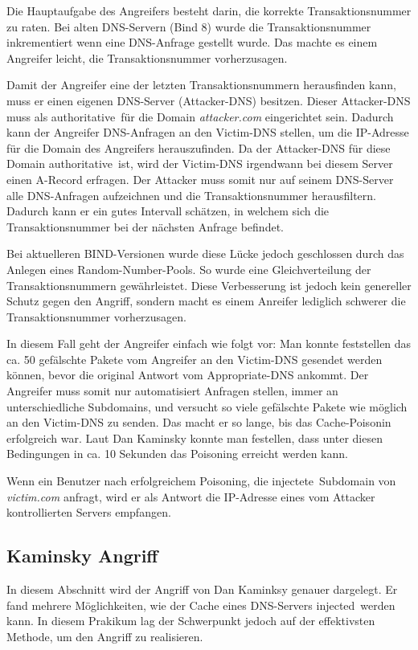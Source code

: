\documentclass[10pt,a4paper]{article}
\begin{document}
Die Hauptaufgabe des Angreifers besteht darin, die korrekte Transaktionsnummer zu raten. Bei alten DNS-Servern (Bind 8) wurde die Transaktionsnummer inkrementiert wenn eine DNS-Anfrage gestellt wurde. Das machte es einem Angreifer leicht, die Transaktionsnummer vorherzusagen.

Damit der Angreifer eine der letzten Transaktionsnummern herausfinden kann, muss er einen eigenen DNS-Server (Attacker-DNS) besitzen. Dieser Attacker-DNS muss als \glqq authoritative\grqq\ für die Domain \mbox{\emph{attacker.com}} eingerichtet sein. Dadurch kann der Angreifer DNS-Anfragen an den Victim-DNS stellen, um die IP-Adresse für die Domain des Angreifers herauszufinden. Da der Attacker-DNS für diese Domain \glqq authoritative\grqq\ ist, wird der Victim-DNS irgendwann bei diesem Server einen A-Record erfragen. Der Attacker muss somit nur auf seinem DNS-Server alle DNS-Anfragen aufzeichnen und die Transaktionsnummer herausfiltern. Dadurch kann er ein gutes Intervall schätzen, in welchem sich die Transaktionsnummer bei der nächsten Anfrage befindet.

Bei aktuelleren BIND-Versionen wurde diese Lücke jedoch geschlossen durch das Anlegen eines Random-Number-Pools. So wurde eine Gleichverteilung der Transaktionsnummern gewährleistet. Diese Verbesserung ist jedoch kein genereller Schutz gegen den Angriff, sondern macht es einem Anreifer lediglich schwerer die Transaktionsnummer vorherzusagen. 

In diesem Fall geht der Angreifer einfach wie folgt vor: Man konnte feststellen das ca. 50 gefälschte Pakete vom Angreifer an den Victim-DNS gesendet werden können, bevor die original Antwort vom Appropriate-DNS ankommt. Der Angreifer muss somit nur automatisiert Anfragen stellen, immer an unterschiedliche Subdomains, und versucht so viele gefälschte Pakete wie möglich an den Victim-DNS zu senden. Das macht er so lange, bis das Cache-Poisonin erfolgreich war. Laut Dan Kaminsky konnte man festellen, dass unter diesen Bedingungen in ca. 10 Sekunden das Poisoning erreicht werden kann.

Wenn ein Benutzer nach erfolgreichem Poisoning, die \glqq injectete\grqq\ Subdomain von \emph{victim.com} anfragt, wird er als Antwort die IP-Adresse eines vom Attacker kontrollierten Servers empfangen.

\subsection{Kaminsky Angriff}
In diesem Abschnitt wird der Angriff von Dan Kaminksy genauer dargelegt. Er fand mehrere Möglichkeiten, wie der Cache eines DNS-Servers \glqq injected\grqq\ werden kann. In diesem Prakikum lag der Schwerpunkt jedoch auf der effektivsten Methode, um den Angriff zu realisieren. 
\end{document}
